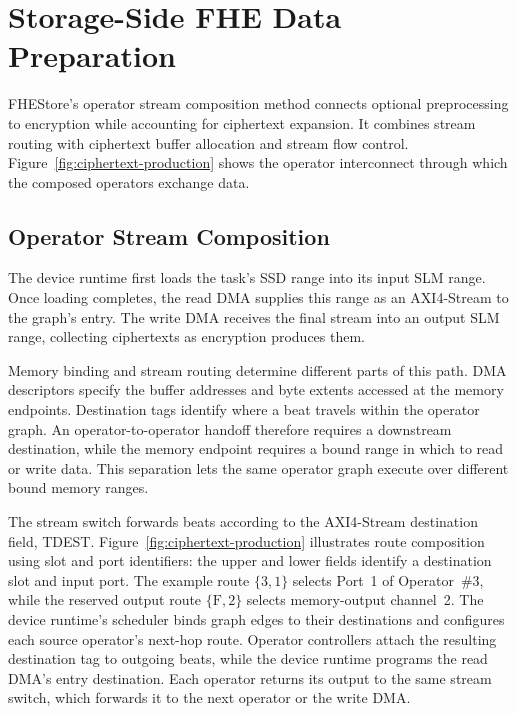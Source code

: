 \documentclass[sigconf,anonymous,balance=false]{acmart}
\newcommand{\bodypar}{\par\vskip 0pt plus 6pt\relax}
\begin{document}
\section{Storage-Side FHE Data Preparation}
\label{sec:production}

FHEStore's operator stream composition method connects optional preprocessing to encryption while accounting for ciphertext expansion. It combines stream routing with ciphertext buffer allocation and stream flow control. Figure~\ref{fig:ciphertext-production} shows the operator interconnect through which the composed operators exchange data.

\subsection{Operator Stream Composition}
\label{subsec:streaming-production}

The device runtime first loads the task's SSD range into its input SLM range. Once loading completes, the read DMA supplies this range as an AXI4-Stream to the graph's entry. The write DMA receives the final stream into an output SLM range, collecting ciphertexts as encryption produces them.
\bodypar

Memory binding and stream routing determine different parts of this path. DMA descriptors specify the buffer addresses and byte extents accessed at the memory endpoints. Destination tags identify where a beat travels within the operator graph. An operator-to-operator handoff therefore requires a downstream destination, while the memory endpoint requires a bound range in which to read or write data. This separation lets the same operator graph execute over different bound memory ranges.
\bodypar

The stream switch forwards beats according to the AXI4-Stream destination field, TDEST. Figure~\ref{fig:ciphertext-production} illustrates route composition using slot and port identifiers: the upper and lower fields identify a destination slot and input port. The example route $\{3,1\}$ selects Port~1 of Operator~\#3, while the reserved output route $\{\mathrm{F},2\}$ selects memory-output channel~2. The device runtime's scheduler binds graph edges to their destinations and configures each source operator's next-hop route. Operator controllers attach the resulting destination tag to outgoing beats, while the device runtime programs the read DMA's entry destination. Each operator returns its output to the same stream switch, which forwards it to the next operator or the write DMA.
\bodypar
\end{document}
